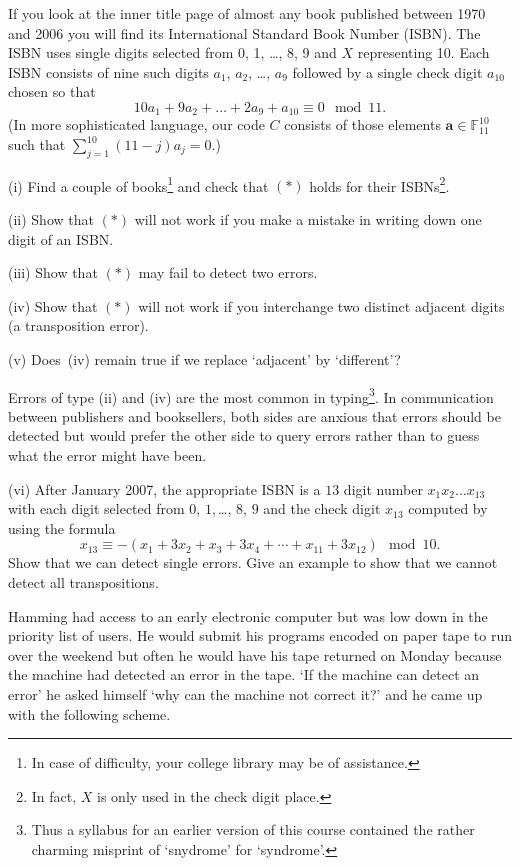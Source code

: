 \begin{exercise}\label{ISBN}
If you look
at the inner
title page of almost any book published between
1970 and 2006
you will find its International Standard
Book Number (ISBN). The ISBN
uses single digits selected from 0, 1, \dots, 8, 9
and $X$ representing 10. Each ISBN consists
of nine such digits $a_{1}$, $a_{2}$, \dots, $a_{9}$
followed by a single check digit $a_{10}$ chosen
so that
\begin{equation*}
10a_{1}+9a_{2}+ \dots+2a_{9}+a_{10}\equiv 0\mod{11}.\tag*{(*)}
\end{equation*}
(In more sophisticated language, our code $C$ consists
of those elements ${\mathbf a}\in {\mathbb F}_{11}^{10}$
such that $\sum_{j=1}^{10}(11-j)a_{j}=0$.)

(i) Find a couple of books\footnote{In case of difficulty,
your college library may be of assistance.}
and check that $(*)$ holds for their ISBNs\footnote{In fact,
$X$ is only used in the check digit place.}.

(ii) Show that $(*)$ will not work if you make a mistake
in writing down one digit of an ISBN.

(iii) Show that
$(*)$ may fail to detect two errors.

(iv) Show that $(*)$ will not work if you interchange
two distinct adjacent digits (a transposition error).

(v) Does~(iv) remain true if we replace `adjacent'
by `different'?

\noindent Errors of type (ii) and (iv) are the most common
in typing\footnote{Thus a syllabus for an 
earlier version of this
course contained the rather charming misprint
of `snydrome' for `syndrome'.}.
In communication between publishers and booksellers,
both sides are anxious that errors should be detected
but would prefer the other side to query errors
rather than to guess what the error might have been.

(vi) After January 2007, the appropriate ISBN is a $13$ digit number
$x_{1}x_{2}\dots x_{13}$ with each digit 
selected from $0$, $1$,\,\dots, $8$, $9$ and
the check digit $x_{13}$ computed by using the formula
\[x_{13}\equiv -(x_{1}+3x_{2}+x_{3}+3x_{4}+\cdots+x_{11}+ 3x_{12}) 
\mod{10}.\]
Show that we can detect single errors. Give an example
to show that we cannot detect all transpositions.
\end{exercise}

Hamming had access to an early electronic computer
but was low down in the priority list of users.
He would submit his
programs encoded on paper tape to run over the
weekend but often he would have his tape returned
on Monday because the machine had detected an error
in the tape. `If the machine can detect an error'
he asked himself `why can the machine not correct it?'
and he came up with the following scheme.

